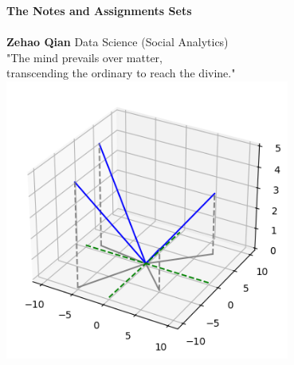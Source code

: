 % 
\begin{titlepage}
    \centering
    \vspace*{\fill}
    \vspace*{1cm}
    \textbf{\fontsize{17.28}{18}\selectfont The Notes and Assignments Sets} \\
    \vspace{0.5cm}
    \fontsize{14}{16}\selectfont{Introduction to Mathematics for Data Science} \\
    \vspace{1.5cm}
    \textbf{Zehao Qian}
    \vfill
    Data Science (Social Analytics) \\
    \vspace{0.9cm}
    "The mind prevails over matter,\\ transcending the ordinary to reach the divine."
    \vspace{0.9cm}
    \vspace{0.9cm}
    \includegraphics[width=0.7\textwidth]{pic/coverpic.png}
    \vspace*{\fill}
\end{titlepage}
% 